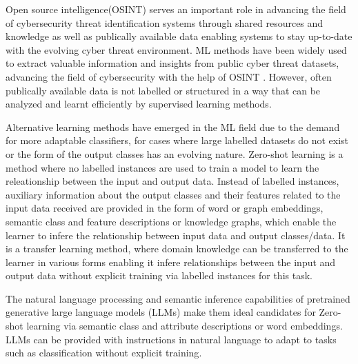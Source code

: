 \documentclass[letterpaper,twocolumn,fleqn]{article}
\begin{document}
Open source intelligence(OSINT) serves an important role in advancing the field of cybersecurity threat identification systems through shared resources and knowledge as well as publically available data enabling systems to stay up-to-date with the evolving cyber threat environment\cite{pastor-galindoNotExploitedGoldmine2020,zhangMiningOpenSourceCyber2021,zhangMiningOpenSourceCyber2021}. 
ML methods have been widely used to extract valuable information and insights from public cyber threat datasets, advancing the field of cybersecurity with the help of OSINT \cite{zhangMiningOpenSourceCyber2021,shaukatCyberThreatDetection2020,liSecurityOSIFAutomatic2018,kuehnThreatCrawlBERTbasedFocused2023,jainSpamDetectionSocial2018,gaoThreatKGAIPoweredSystem2024,ecolenationalesuperieuredesminesdeparisfranceInterpretableIdentificationCybersecurity2021,dionisioCyberthreatDetectionTwitter2019,chenPerformanceEvaluationMachine2015,chen6MillionSpam2015,al-yaseenRealtimeMultiagentSystem2017,abriPerformanceMachineDeep2019,abdullahCyberAttackFeaturesDetecting2018}.
However, often publically available data is not labelled or structured in a way that can be analyzed and learnt efficiently by supervised learning methods\cite{chenZeroShotTextClassification2022}.  

Alternative learning methods have emerged in the ML field due to the demand for more adaptable classifiers\cite{uddinDualTierAdaptiveOneClass2024}, for cases where large labelled datasets do not exist or the form of the output classes has an evolving nature\cite{wangSurveyZeroShotLearning2019}. 
Zero-shot learning is a method where no labelled instances are used to train a model to learn the releationship between the input and output data\cite{wangSurveyZeroShotLearning2019,pushpTrainOnceTest2017}. Instead of labelled instances, auxiliary information about the output classes and their features related to the input data received are provided in the form of word or graph embeddings, semantic class and feature descriptions or knowledge graphs, which enable the learner to infere the relationship between input data and output classes/data\cite{wangSurveyZeroShotLearning2019,pushpTrainOnceTest2017}. 
It is a transfer learning method, where domain knowledge can be transferred to the learner in various forms enabling it infere relationships between the input and output data without explicit training via labelled instances for this task\cite{wangSurveyZeroShotLearning2019,pushpTrainOnceTest2017}.

The natural language processing and semantic inference capabilities of pretrained generative large language models (LLMs) make them ideal candidates for Zero-shot learning via semantic class and attribute descriptions or word embeddings\cite{puriZeroshotTextClassification2019}. LLMs can be provided with instructions in natural language to adapt to tasks such as classification without explicit training\cite{puriZeroshotTextClassification2019}. 
\end{document}
